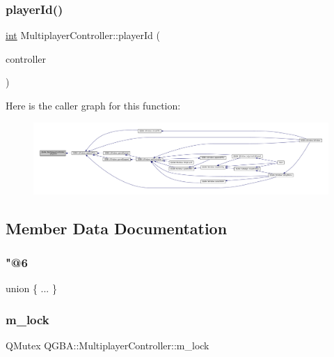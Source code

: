 \subsubsection{\texorpdfstring{player\+Id()}{playerId()}}
{\footnotesize\ttfamily \mbox{\hyperlink{ioapi_8h_a787fa3cf048117ba7123753c1e74fcd6}{int}} Multiplayer\+Controller\+::player\+Id (\begin{DoxyParamCaption}\item[{\mbox{\hyperlink{class_q_g_b_a_1_1_core_controller}{Core\+Controller}} $\ast$}]{controller }\end{DoxyParamCaption})}

Here is the caller graph for this function\+:
\nopagebreak
\begin{figure}[H]
\begin{center}
\leavevmode
\includegraphics[width=350pt]{class_q_g_b_a_1_1_multiplayer_controller_a026387b700c0e6935190107434fbe103_icgraph}
\end{center}
\end{figure}


\subsection{Member Data Documentation}
\mbox{\label{class_q_g_b_a_1_1_multiplayer_controller_a7139a6328bfebf8aa3c2a47e51e88997}} 
\subsubsection{\texorpdfstring{"@6}{@6}}
{\footnotesize\ttfamily union \{ ... \} \hspace{0.3cm}{\ttfamily [private]}}

\mbox{\label{class_q_g_b_a_1_1_multiplayer_controller_a517f06034d4984a389644739fcbb3724}} 
\subsubsection{\texorpdfstring{m\+\_\+lock}{m\_lock}}
{\footnotesize\ttfamily Q\+Mutex Q\+G\+B\+A\+::\+Multiplayer\+Controller\+::m\+\_\+lock\hspace{0.3cm}{\ttfamily [private]}}

